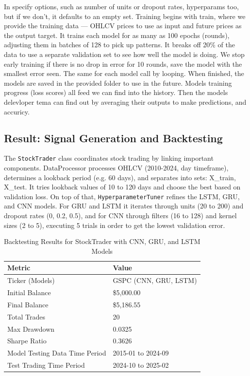 In specify options, such as number of units or dropout rates, hyperparams too, but if we don’t, it defaults to an empty set. Training begins with train, where we provide the training data — OHLCV prices to use as input and future prices as the output target. It trains each model for as many as 100 epochs (rounds), adjusting them in batches of 128 to pick up patterns. It breaks off 20\% of the data to use a separate validation set to see how well the model is doing. We stop early training if there is no drop in error for 10 rounds, save the model with the smallest error seen. The same for each model call by looping. When finished, the models are saved in the provided folder to use in the future. Models training progress (loss scores) all feed we can find into the history. Then the models delevloper tema can find out by averaging their outputs to make predictions, and accuricy.

\subsection{Result: Signal Generation and Backtesting}
The \texttt{StockTrader} class coordinates stock trading by linking important components. DataProcessor processes OHLCV (2010-2024, day timeframe), determines a lookback period (e.g. 60 days), and separates into sets: X\_train, X\_test. It tries lookback values of 10 to 120 days and choose the best based on validation loss. On top of that, \texttt{HyperparameterTuner} refines the LSTM, GRU, and CNN models. For GRU and LSTM it iterates through units (20 to 200) and dropout rates (0, 0.2, 0.5), and for CNN through filters (16 to 128) and kernel sizes (2 to 5), executing 5 trials in order to get the lowest validation error.

\begin{table}[h]
\small
\centering
\caption{Backtesting Results for StockTrader with CNN, GRU, and LSTM Models}
\label{tab:backtest_results}
\begin{tabular}{ll}
\toprule
\textbf{Metric} & \textbf{Value} \\
\midrule
Ticker (Models) & GSPC (CNN, GRU, LSTM) \\
Initial Balance & \$5,000.00 \\
Final Balance & \$5,186.55 \\
Total Trades & 20 \\
Max Drawdown & 0.0325 \\
Sharpe Ratio & 0.3626 \\
Model Testing Data Time Period & 2015-01 to 2024-09 \\
Test Trading Time Period & 2024-10 to 2025-02 \\
\bottomrule
\end{tabular}
\end{table}

